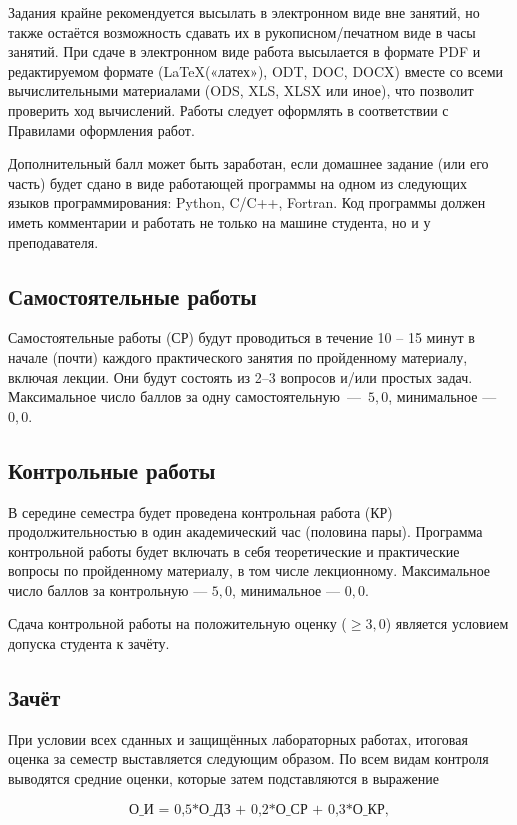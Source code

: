 \documentclass[11pt, a4paper]{article}
\theoremstyle{plain}
\theoremstyle{definition}
\theoremstyle{remark}
\renewcommand{\geq}{\ensuremath{\geqslant}}
\begin{document}
Задания крайне рекомендуется высылать в электронном виде вне занятий, но также остаётся возможность сдавать их в рукописном/печатном виде в часы занятий. При сдаче в электронном виде работа
высылается в формате PDF и редактируемом формате (\LaTeX («латех»), ODT, DOC, DOCX)
вместе со всеми вычислительными материалами (ODS, XLS, XLSX или иное), что позволит
проверить ход вычислений. Работы следует оформлять в соответствии с Правилами оформления работ.

Дополнительный балл может быть заработан, если домашнее задание (или его часть) будет сдано
в виде работающей программы на одном из следующих языков программирования: Python, C/C++, Fortran. Код программы должен иметь комментарии
и работать не только на машине студента, но и у преподавателя.

\subsection{Самостоятельные работы}
Самостоятельные работы (СР) будут проводиться в течение 10 -- 15 минут в начале (почти) каждого
практического занятия по пройденному материалу, включая лекции. Они будут состоять из 2--3 вопросов
и/или простых задач. Максимальное число баллов за одну самостоятельную~---~$5,0$, минимальное --- $0,0$.

\subsection{Контрольные работы}
В середине семестра будет проведена контрольная работа (КР) продолжительностью в один академический час (половина пары). Программа
контрольной работы будет включать в себя теоретические и практические вопросы по пройденному материалу, в
том числе лекционному. Максимальное число баллов за контрольную --- $5,0$, минимальное --- $0,0$.\par
Сдача контрольной работы на положительную оценку ($\geq 3,0$) является условием допуска 
студента к зачёту.

\subsection{Зачёт}
При условии всех сданных и защищённых лабораторных работах, итоговая оценка за семестр выставляется
следующим образом. По всем видам контроля выводятся средние оценки, которые затем подставляются в
выражение

\begin{equation*}
    \text{О\_И = 0,5*О\_ДЗ + 0,2*О\_СР + 0,3*О\_КР},
\end{equation*}
\end{document}
